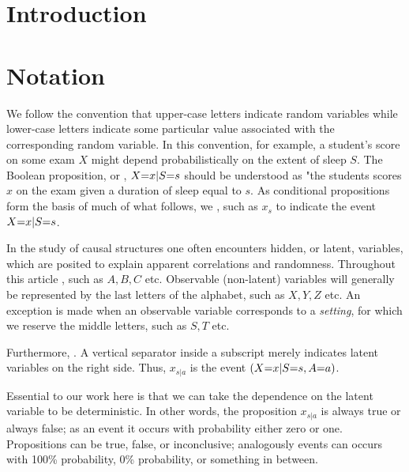\section{Introduction}


\section{Notation}

We follow the convention that upper-case letters indicate random variables while lower-case letters indicate some particular value associated with the corresponding random variable. In this convention, for example, a student's score on some exam $X$ might depend probabilistically on the extent of sleep $S$. The Boolean proposition, or , $X\cramp{=}x|S\cramp{=}s$ should be understood as "the students scores $x$ on the exam given a duration of sleep equal to $s$. As conditional propositions form the basis of much of what follows, we , such as $x_s$ to indicate the event $X\cramp{=}x | S\cramp{=}s$. 

In the study of causal structures one often encounters hidden, or latent, variables, which are posited to explain apparent correlations and randomness. Throughout this article , such as $A,B,C$ etc. 
Observable (non-latent) variables will generally be represented by the last letters of the alphabet, such as $X,Y,Z$ etc. An exception is made when an observable variable corresponds to a \emph{setting}, for which we reserve the middle letters, such as $S,T$ etc.

Furthermore, . A vertical separator inside a subscript merely indicates latent variables on the right side. Thus, $x_{s|a}$ is the event $\parens*{X\cramp{=}x|S\cramp{=}s,A\cramp{=}a}$.  

Essential to our work here is that we can take the dependence on the latent variable to be deterministic. In other words, the  proposition $x_{s|a}$ is always true or always false; as an event it occurs with probability either zero or one. Propositions can be true, false, or inconclusive; analogously events can occurs with 100\% probability, 0\% probability, or something in between.

